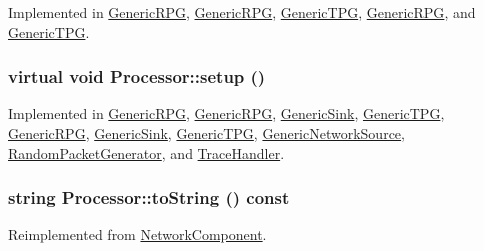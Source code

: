 Implemented in \hyperlink{classGenericRPG_0f15df71a8cb244d55a2dce961b7a972}{GenericRPG}, \hyperlink{classGenericRPG_0f15df71a8cb244d55a2dce961b7a972}{GenericRPG}, \hyperlink{classGenericTPG_e95391a655cacb75ba23e7eb8b3cefef}{GenericTPG}, \hyperlink{classGenericRPG_0f15df71a8cb244d55a2dce961b7a972}{GenericRPG}, and \hyperlink{classGenericTPG_e95391a655cacb75ba23e7eb8b3cefef}{GenericTPG}.\hypertarget{classProcessor_495fad01358e2d9760c526d6e2db53ea}{
\subsubsection[{setup}]{\setlength{\rightskip}{0pt plus 5cm}virtual void Processor::setup ()}}
\label{classProcessor_495fad01358e2d9760c526d6e2db53ea}




Implemented in \hyperlink{classGenericRPG_e872cb83c70fbf7139fbf1b5cf14310f}{GenericRPG}, \hyperlink{classGenericRPG_e872cb83c70fbf7139fbf1b5cf14310f}{GenericRPG}, \hyperlink{classGenericSink_0ed90ea7e6e66cfa8b9935b50ef0051d}{GenericSink}, \hyperlink{classGenericTPG_5cea355b4db26ed22a7af8e54758de47}{GenericTPG}, \hyperlink{classGenericRPG_e872cb83c70fbf7139fbf1b5cf14310f}{GenericRPG}, \hyperlink{classGenericSink_0ed90ea7e6e66cfa8b9935b50ef0051d}{GenericSink}, \hyperlink{classGenericTPG_5cea355b4db26ed22a7af8e54758de47}{GenericTPG}, \hyperlink{classGenericNetworkSource_a1390d4685120020d9b9564ee19df854}{GenericNetworkSource}, \hyperlink{classRandomPacketGenerator_56eccc2d487bfed691a85afbd0c5b06d}{RandomPacketGenerator}, and \hyperlink{classTraceHandler_9311bd94c5ad0a6e354d2a0bd8b8699a}{TraceHandler}.\hypertarget{classProcessor_d3bdbedfbb00b05f61504e411a418106}{
\subsubsection[{toString}]{\setlength{\rightskip}{0pt plus 5cm}string Processor::toString () const}}
\label{classProcessor_d3bdbedfbb00b05f61504e411a418106}




Reimplemented from \hyperlink{classNetworkComponent_9bb9874e1f5705588cb3d9c201d8fc6f}{NetworkComponent}.

